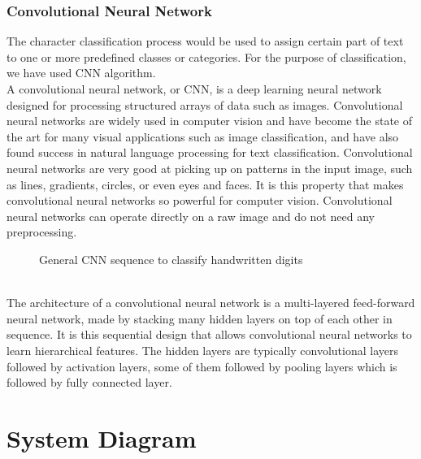 \subsubsection{Convolutional Neural Network}
The character classification process would be used to assign certain part of text to one or more predefined classes or categories. For the purpose of classification, we have used CNN algorithm.
\\A convolutional neural network, or CNN, is a deep learning neural network designed for processing structured arrays of data such as images. Convolutional neural networks are widely used in computer vision and have become the state of the art for many visual applications such as image classification, and have also found success in natural language processing for text classification. Convolutional neural networks are very good at picking up on patterns in the input image, such as lines, gradients, circles, or even eyes and faces. It is this property that makes convolutional neural networks so powerful for computer vision. Convolutional neural networks can operate directly on a raw image and do not need any preprocessing.
\begin{figure}[tbh] %
\begin{center}
	\caption{General CNN sequence to classify handwritten digits}
	\label{figObjectDetectionusingYOLO} %
\end{center}
\end{figure}\\
The architecture of a convolutional neural network is a multi-layered feed-forward neural network, made by stacking many hidden layers on top of each other in sequence. It is this sequential design that allows convolutional neural networks to learn hierarchical features. The hidden layers are typically convolutional layers followed by activation layers, some of them followed by pooling layers which is followed by fully connected layer.




 \section{System Diagram}
